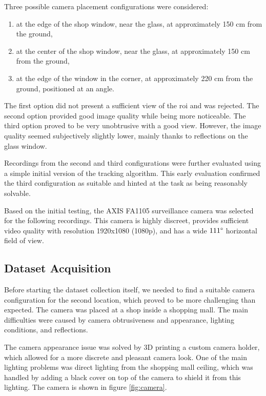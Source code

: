 Three possible camera placement configurations were considered:
\begin{enumerate}
    \item at the edge of the shop window, near the glass, at approximately 150 cm from the ground,
    \item at the center of the shop window, near the glass, at approximately 150 cm from the ground,
    \item at the edge of the window in the corner, at approximately 220 cm from the ground, positioned at an angle.
\end{enumerate}

The first option did not present a sufficient view of the \gls{roi} and was rejected. The second option provided good image quality while being more noticeable. The third option proved to be very unobtrusive with a good view. However, the image quality seemed subjectively slightly lower, mainly thanks to reflections on the glass window.

Recordings from the second and third configurations were further evaluated using a simple initial version of the tracking algorithm. This early evaluation confirmed the third configuration as suitable and hinted at the task as being reasonably solvable. 

Based on the initial testing, the AXIS FA1105 surveillance camera\cite{axis_fa1105} was selected for the following recordings. This camera is highly discreet, provides sufficient video quality with resolution 1920x1080 (1080p), and has a wide $111\degree$ horizontal field of view.

\subsection{Dataset Acquisition}\label{s:dataset_acquisition}

Before starting the dataset collection itself, we needed to find a suitable camera configuration for the second location, which proved to be more challenging than expected. The camera was placed at a shop inside a shopping mall. The main difficulties were caused by camera obtrusiveness and appearance, lighting conditions, and reflections.

The camera appearance issue was solved by 3D printing a custom camera holder, which allowed for a more discrete and pleasant camera look. One of the main lighting problems was direct lighting from the shopping mall ceiling, which was handled by adding a black cover on top of the camera to shield it from this lighting. The camera is shown in figure \ref{fig:camera}.

